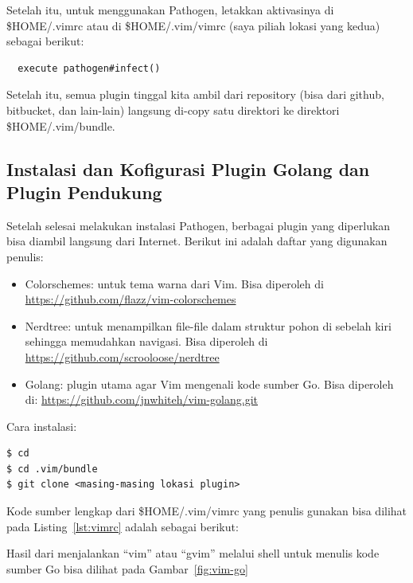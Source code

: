 Setelah itu, untuk menggunakan Pathogen, letakkan aktivasinya di \$HOME/.vimrc atau di \$HOME/.vim/vimrc (saya piliah lokasi yang kedua) sebagai berikut:

\begin{mdframed}[style=catatan]
  \begin{verbatim}
  execute pathogen#infect()
  \end{verbatim}
\end{mdframed}

Setelah itu, semua plugin tinggal kita ambil dari repository (bisa dari github, bitbucket, dan lain-lain) langsung di-copy satu direktori ke direktori \$HOME/.vim/bundle.

\subsection{Instalasi dan Kofigurasi Plugin Golang dan Plugin Pendukung}

Setelah selesai melakukan instalasi Pathogen, berbagai plugin yang diperlukan bisa diambil langsung dari Internet. Berikut ini adalah daftar yang digunakan penulis:
\begin{itemize}
  \item Colorschemes: untuk tema warna dari Vim. Bisa diperoleh di \url{https://github.com/flazz/vim-colorschemes}
  \item Nerdtree: untuk menampilkan file-file dalam struktur pohon di sebelah kiri sehingga memudahkan navigasi. Bisa diperoleh di \url{https://github.com/scrooloose/nerdtree}
  \item Golang: plugin utama agar Vim mengenali kode sumber Go. Bisa diperoleh di: \url{https://github.com/jnwhiteh/vim-golang.git}
\end{itemize}

Cara instalasi:

\begin{mdframed}[style=catatan]
  \begin{verbatim}
$ cd 
$ cd .vim/bundle
$ git clone <masing-masing lokasi plugin>
\end{verbatim}
\end{mdframed}

Kode sumber lengkap dari \$HOME/.vim/vimrc yang penulis gunakan bisa dilihat pada Listing~\ref{lst:vimrc} adalah sebagai berikut:



Hasil dari menjalankan ``vim'' atau ``gvim'' melalui shell untuk menulis kode sumber Go bisa dilihat pada Gambar~\ref{fig:vim-go}

